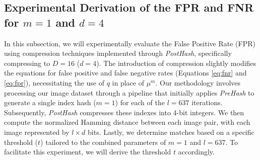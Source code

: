 \subsection{Experimental Derivation of the FPR and FNR for \(m = 1\) and \(d = 4\)}
In this subsection, we will experimentally evaluate the False Positive Rate (FPR) using compression techniques implemented through \textit{PostHash}, specifically compressing to \(D = 16\) (\(d=4\)). The introduction of compression slightly modifies the equations for false positive and false negative rates (Equations \ref{eq:fnr} and \ref{eq:fpr}), necessitating the use of \(q\) in place of \(\mu^m\). Our methodology involves processing our image dataset through a pipeline that initially applies \textit{PreHash} to generate a single index hash (\(m=1\)) for each of the \(l=637\) iterations. Subsequently, \textit{PostHash} compresses these indexes into 4-bit integers. We then compute the normalized Hamming distance between each image pair, with each image represented by \(l \times d\) bits. Lastly, we determine matches based on a specific threshold (\(t\)) tailored to the combined parameters of \(m=1\) and \(l=637\). To facilitate this experiment, we will derive the threshold \(t\) accordingly.